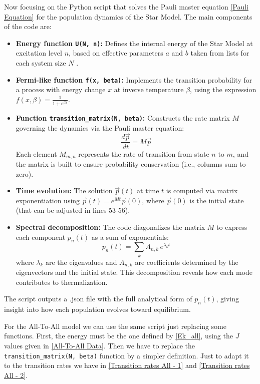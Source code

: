 Now focusing on the Python script that solves the Pauli master equation \eqref{Pauli Equation} for the population dynamics of the Star Model. The main components of the code are:

\begin{itemize}
  \item \textbf{Energy function \texttt{U(N, n)}:} Defines the internal energy of the Star Model at excitation level $n$, based on effective parameters $a$ and $b$ taken from lists for each system size $N$ \cite{abiuso2022optimal}.

  \item \textbf{Fermi-like function \texttt{f(x, beta)}:} Implements the transition probability for a process with energy change $x$ at inverse temperature $\beta$, using the expression $f(x, \beta) = \frac{1}{1 + e^{\beta x}}$.

  \item \textbf{Function \texttt{transition\_matrix(N, beta)}:} Constructs the rate matrix $M$ governing the dynamics via the Pauli master equation:
  \begin{equation}
  \frac{d\vec{p}}{dt} = M \vec{p}
  \end{equation}
  Each element $M_{m,n}$ represents the rate of transition from state $n$ to $m$, and the matrix is built to ensure probability conservation (i.e., columns sum to zero).

  \item \textbf{Time evolution:} The solution $\vec{p}(t)$ at time $t$ is computed via matrix exponentiation using $\vec{p}(t) = e^{Mt} \vec{p}(0)$, where $\vec{p}(0)$ is the initial state (that can be adjusted in lines 53-56).

  \item \textbf{Spectral decomposition:} The code diagonalizes the matrix $M$ to express each component $p_n(t)$ as a sum of exponentials:
  \begin{equation}
  p_n(t) = \sum_k A_{n,k} \, e^{\lambda_k t}
  \end{equation}
  where $\lambda_k$ are the eigenvalues and $A_{n,k}$ are coefficients determined by the eigenvectors and the initial state. This decomposition reveals how each mode contributes to thermalization.

\end{itemize}

The script outputs a .json file with the full analytical form of $p_n(t)$, giving insight into how each population evolves toward equilibrium.
\vspace{0.3 cm}

\newpage
For the All-To-All model we can use the same script just replacing some functions. First, the energy must be the one defined by \eqref{Ek_all}, using the $J$ values given in \ref{All-To-All Data}. Then we have to replace the \texttt{transition\_matrix(N, beta)} function by a simpler definition. Just to adapt it to the transition rates we have in \eqref{Transition rates All - 1} and \eqref{Transition rates All - 2}.

